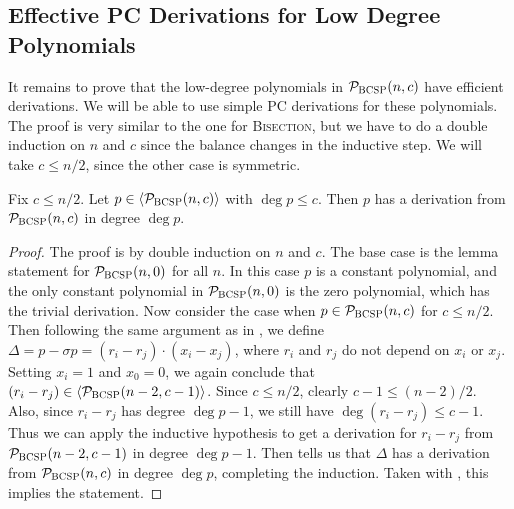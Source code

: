 \subsection{Effective PC Derivations for Low Degree Polynomials}
It remains to prove that the low-degree polynomials in $\mathcal P_{\textsc{BCSP}}(n,c)$ have efficient derivations. We will be able to use simple PC derivations for these polynomials. The proof is very similar to the one for \textsc{Bisection}, but we have to do a double induction on $n$ and $c$ since the balance changes in the inductive step. We will take $c \leq n/2$, since the other case is symmetric.
\begin{lemma}\label{lem:lowdeg-easy}
Fix $c \leq n/2$. Let $p \in \langle \mathcal P_{\textsc{BCSP}}(n,c) \rangle$ with $\deg p \leq c$. Then $p$ has a derivation from $\mathcal P_{\textsc{BCSP}}(n,c)$ in degree $\deg p$. 
\end{lemma}
\begin{proof}
The proof is by double induction on $n$ and $c$. The base case is the lemma statement for $\mathcal P_{\textsc{BCSP}}(n,0)$ for all $n$. In this case $p$ is a constant polynomial, and the only constant polynomial in $\mathcal P_{\textsc{BCSP}}(n,0)$ is the zero polynomial, which has the trivial derivation. Now consider the case when $p \in \mathcal P_{\textsc{BCSP}}(n,c)$ for $c \leq n/2$. Then following the same argument as in , we define $\Delta = p - \sigma p = (r_i - r_j)\cdot (x_i - x_j)$, where $r_i$ and $r_j$ do not depend on $x_i$ or $x_j$. Setting $x_i = 1$ and $x_0 = 0$, we again conclude that $(r_i - r_j) \in \langle \mathcal P_{\textsc{BCSP}}(n-2,c-1) \rangle$. Since $c \leq n/2$, clearly $c-1 \leq (n-2)/2$. Also, since $r_i - r_j$ has degree $\deg p - 1$, we still have $\deg (r_i - r_j) \leq c-1$. Thus we can apply the inductive hypothesis to get a derivation for $r_i - r_j$ from $\mathcal P_{\textsc{BCSP}}(n-2,c-1)$ in degree $\deg p - 1$. Then  tells us that $\Delta$ has a derivation from $\mathcal P_{\textsc{BCSP}}(n,c)$ in degree $\deg p$, completing the induction. Taken with , this implies the statement. 
\end{proof}

